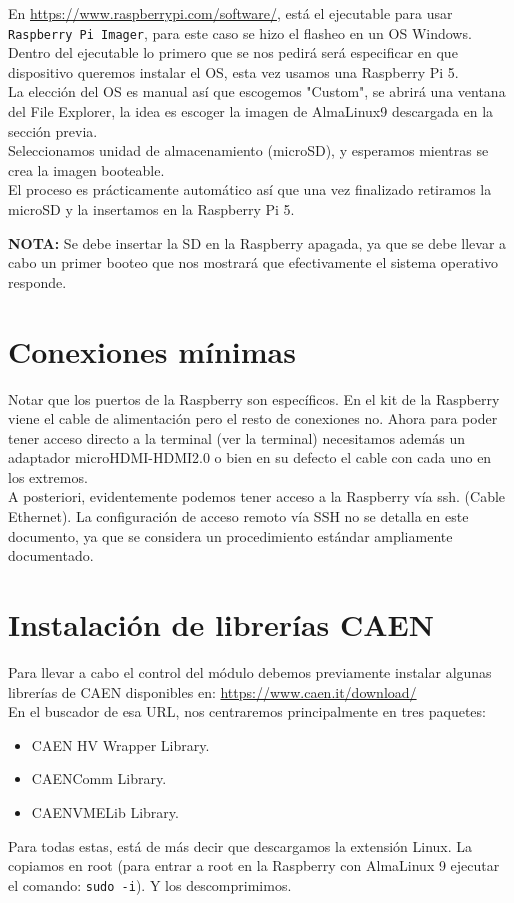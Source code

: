 \documentclass{article}
\begin{document}
En \url{https://www.raspberrypi.com/software/}, está el ejecutable para usar \texttt{Raspberry Pi Imager}, para este caso se hizo el flasheo en un OS Windows.
Dentro del ejecutable lo primero que se nos pedirá será especificar en que dispositivo queremos instalar el OS, esta vez usamos una Raspberry Pi 5.\\

La elección del OS es manual así que escogemos "Custom", se abrirá una ventana del File Explorer, la idea es escoger la imagen de AlmaLinux9 descargada en la sección previa.\\

Seleccionamos unidad de almacenamiento (microSD), y esperamos mientras se crea la imagen booteable. \\

El proceso es prácticamente automático así que una vez finalizado retiramos la microSD y la insertamos en la Raspberry Pi 5.

\textbf{NOTA:} Se debe insertar la SD en la Raspberry apagada, ya que se debe llevar a cabo un primer booteo que nos mostrará que efectivamente el sistema operativo responde. 

\section{Conexiones mínimas}

Notar que los puertos de la Raspberry son específicos. En el kit de la Raspberry viene el cable de alimentación pero el resto de conexiones no. Ahora para poder tener acceso directo a la terminal (ver la terminal) necesitamos además un adaptador microHDMI-HDMI2.0 o bien en su defecto el cable con cada uno en los extremos.\\
A posteriori, evidentemente podemos tener acceso a la Raspberry vía ssh. (Cable Ethernet). La configuración de acceso remoto vía SSH no se detalla en este documento, ya que se considera un procedimiento estándar ampliamente documentado.\\


\section{Instalación de librerías CAEN}

Para llevar a cabo el control del módulo debemos previamente instalar algunas librerías de CAEN disponibles en: \url{https://www.caen.it/download/}\\
En el buscador de esa URL, nos centraremos principalmente en tres paquetes:
\begin{itemize}
    \item CAEN HV Wrapper Library. 
    \item CAENComm Library.
    \item CAENVMELib Library.
\end{itemize}
Para todas estas, está de más decir que descargamos la extensión Linux. La copiamos en root (para entrar a root en la Raspberry con AlmaLinux 9 ejecutar el comando: \texttt{sudo -i}). Y los descomprimimos.\\
\end{document}
